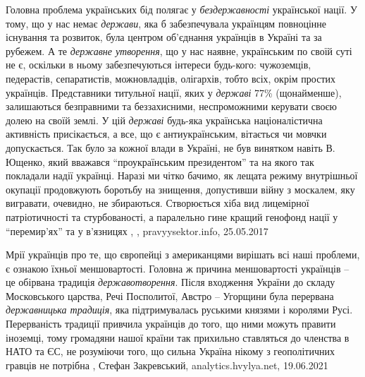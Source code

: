 Головна проблема українських бід полягає у \emph{бездержавності} української нації. У
тому, що у нас немає \emph{держави}, яка б забезпечувала українцям повноцінне
існування та розвиток, була центром об'єднання українців в Україні та за
рубежем. А те \emph{державне утворення}, що у нас наявне, українським по своїй суті не
є, оскільки в ньому забезпечуються інтереси будь-кого: чужоземців, педерастів,
сепаратистів, можновладців, олігархів, тобто всіх, окрім простих українців.
Представники титульної нації, яких у \emph{державі} 77\% (щонайменше), залишаються
безправними та беззахисними, неспроможними керувати своєю долею на своїй землі.
У цій \emph{державі} будь-яка українська націоналістична активність присікається, а
все, що є антиукраїнським, вітається чи мовчки допускається. Так було за кожної
влади в Україні, не був винятком навіть В. Ющенко, який вважався
\enquote{проукраїнським президентом} та на якого так покладали надії українці. Наразі
ми чітко бачимо, як лещата режиму внутрішньої окупації продовжують боротьбу на
знищення, допустивши війну з москалем, яку вигравати, очевидно, не збираються.
Створюється хіба вид лицемірної патріотичності та стурбованості, а паралельно
гине кращий генофонд нації у \enquote{перемир'ях} та у в'язницях
, 
, pravyysektor.info, 25.05.2017

Мрії українців про те, що європейці з американцями вирішать всі наші проблеми,
є ознакою їхньої меншовартості. Головна ж причина меншовартості українців – це
обірвана традиція \emph{державотворення}. Після входження України до складу
Московського царства, Речі Посполитої, Австро – Угорщини була перервана
\emph{державницька традиція}, яка підтримувалась руськими князями і королями Русі.
Перерваність традиції привчила українців до того, що ними можуть правити
іноземці, тому громадяни нашої країни так прихильно ставляться до членства в
НАТО та ЄС, не розуміючи того, що сильна Україна нікому з геополітичних гравців
не потрібна
, Стефан Закревський, 
analytics.hvylya.net, 19.06.2021

